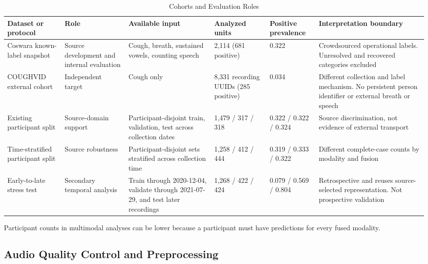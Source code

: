 \documentclass[journal]{IEEEtran}
\begin{document}
\begin{table}[t]
\caption{Cohorts and Evaluation Roles}
\label{tab:cohorts}
\centering
\footnotesize
\begin{threeparttable}
\begin{tabular}{L{2.1cm}L{2.2cm}L{2.4cm}L{2.2cm}L{2.1cm}L{2.7cm}}
\toprule
Dataset or protocol & Role & Available input & Analyzed units & Positive prevalence & Interpretation boundary \\
\midrule
Coswara known-label snapshot & Source development and internal evaluation & Cough, breath, sustained vowels, counting speech & 2,114 (681 positive) & 0.322 & Crowdsourced operational labels. Unresolved and recovered categories excluded \\
COUGHVID external cohort & Independent target & Cough only & 8,331 recording UUIDs (285 positive) & 0.034 & Different collection and label mechanism. No persistent person identifier or external breath or speech \\
Existing participant split & Source-domain support & Participant-disjoint train, validation, test across collection dates & 1,479 / 317 / 318 & 0.322 / 0.322 / 0.324 & Source discrimination, not evidence of external transport \\
Time-stratified participant split & Source robustness & Participant-disjoint sets stratified across collection time & 1,258 / 412 / 444 & 0.319 / 0.333 / 0.322 & Different complete-case counts by modality and fusion \\
Early-to-late stress test & Secondary temporal analysis & Train through 2020-12-04, validate through 2021-07-29, and test later recordings & 1,268 / 422 / 424 & 0.079 / 0.569 / 0.804 & Retrospective and reuses source-selected representation. Not prospective validation \\
\bottomrule
\end{tabular}
\begin{tablenotes}
\item Participant counts in multimodal analyses can be lower because a participant must have predictions for every fused modality.
\end{tablenotes}
\end{threeparttable}
\end{table}

\subsection{Audio Quality Control and Preprocessing}
\end{document}
